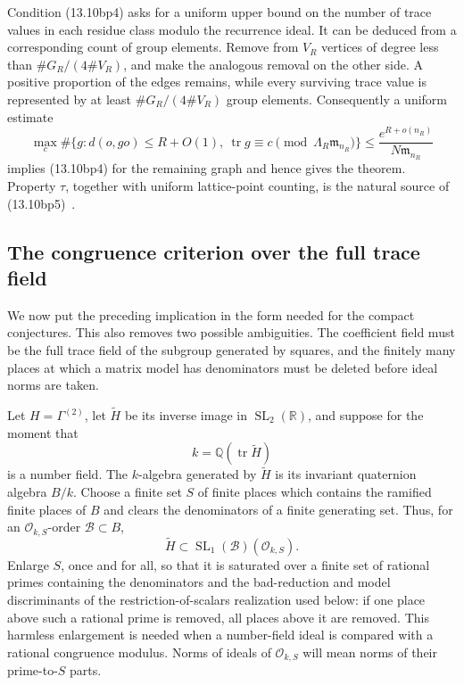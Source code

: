 \documentclass[11pt,reqno]{amsart}
\theoremstyle{definition}
\theoremstyle{remark}
\newcommand{\R}{\mathbb R}
\newcommand{\Q}{\mathbb Q}
\newcommand{\cO}{\mathcal O}
\newcommand{\Tr}{\operatorname{tr}}
\newcommand{\SL}{\operatorname{SL}}
\begin{document}
Condition (13.10bp4) asks for a uniform upper bound on the number of trace
values in each residue class modulo the recurrence ideal.  It can be
deduced from a corresponding count of group elements.  Remove from \(V_R\)
vertices of degree
less than \(\#G_R/(4\#V_R)\), and make the analogous removal on the other
side.  A positive proportion of the edges remains, while every surviving
trace value is represented by at least \(\#G_R/(4\#V_R)\) group elements.
Consequently a uniform estimate
\[
 \max_c\#\{g:d(o,go)\le R+O(1),\ \Tr g\equiv c
                    \pmod{\Lambda_R\mathfrak m_{n_R}}\}
 \le \frac{e^{R+o(n_R)}}{N\mathfrak m_{n_R}}
\tag{13.10bp5}
\]
implies (13.10bp4) for the remaining graph and hence gives the theorem.
Property \(\tau\), together with uniform lattice-point counting, is the
natural source of (13.10bp5)~\cite{GorodnikNevoCounting}.

\subsection{The congruence criterion over the full trace field}

We now put the preceding implication in the form needed for the compact
conjectures.  This also removes two possible ambiguities.  The coefficient
field must be the full trace field of the subgroup generated by squares, and
the finitely many places at which a matrix model has denominators must be
deleted before ideal norms are taken.

Let \(H=\Gamma^{(2)}\), let \(\widetilde H\) be its inverse image in
\(\SL_2(\R)\), and suppose for the moment that
\[
 k=\Q(\Tr\widetilde H)
\tag{13.10bpa}
\]
is a number field.  The \(k\)-algebra generated by \(\widetilde H\) is its
invariant quaternion algebra \(B/k\).  Choose a finite set \(S\) of finite
places which contains the ramified finite places of \(B\) and clears the
denominators of a finite generating set.  Thus, for an
\(\cO_{k,S}\)-order \(\mathcal B\subset B\),
\[
 \widetilde H\subset \SL_1(\mathcal B)(\cO_{k,S}).
\tag{13.10bpb}
\]
Enlarge \(S\), once and for all, so that it is saturated over a finite set
of rational primes containing the denominators and the bad-reduction and
model discriminants of the restriction-of-scalars realization used below:
if one place above such a rational prime is removed, all places above it are
removed.  This harmless enlargement is needed when a number-field ideal is
compared with a rational congruence modulus.
Norms of ideals of \(\cO_{k,S}\) will mean norms of their prime-to-\(S\)
parts.
\end{document}

